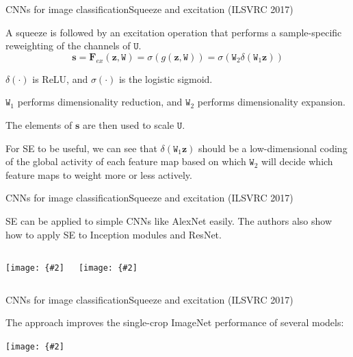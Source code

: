 \documentclass[aspectratio=169]{beamer}
\renewcommand{\vec}[1]{\boldsymbol{#1}}
\newcommand{\mat}[1]{\mathtt{#1}}
\newcommand{\myfig}[3]{\centerline{\texttt{[image: \{\#2]}}}
\begin{document}
\begin{frame}{CNNs for image classification}{Squeeze and excitation (ILSVRC 2017)}

  A squeeze is followed by an \alert{excitation} operation that performs a
  sample-specific reweighting of the channels of $\mat{U}$.
  \[ \vec{s} = \vec{F}_{ex}(\vec{z},\mat{W}) = \sigma(g(\vec{z},\mat{W}))
  = \sigma(\mat{W}_2\delta(\mat{W}_1\vec{z})) \]

  $\delta(\cdot)$ is ReLU, and $\sigma(\cdot)$ is the logistic sigmoid.

  \medskip
  
  $\mat{W}_1$ performs dimensionality reduction, and $\mat{W}_2$
  performs dimensionality expansion.

  \medskip

  The elements of $\vec{s}$ are then used to scale $\mat{U}$.

  \medskip
  
  For SE to be useful, we can see that $\delta(\mat{W}_1\vec{z})$
  should be a low-dimensional coding of the global activity of each
  feature map based on which $\mat{W}_2$ will decide which feature
  maps to weight more or less actively.

\end{frame}


\begin{frame}{CNNs for image classification}{Squeeze and excitation (ILSVRC 2017)}

  SE can be applied to simple CNNs like AlexNet easily. The authors
  also show how to apply SE to Inception modules and ResNet.

  \medskip

  \begin{columns}
    \column{2.2in}
    \myfig{2in}{hu-fig2}{Hu, Shen, and Sun (2018), Fig.\ 2}
    \column{2.2in}
    \myfig{2in}{hu-fig3}{Hu, Shen, and Sun (2018), Fig.\ 3}
  \end{columns}

\end{frame}


\begin{frame}{CNNs for image classification}{Squeeze and excitation (ILSVRC 2017)}

  The approach improves the single-crop ImageNet
  performance of several models:

  \medskip
  
  \myfig{4.5in}{hu-table2}{Hu, Shen, and Sun (2018), Table 2}
  
\end{frame}
\end{document}
